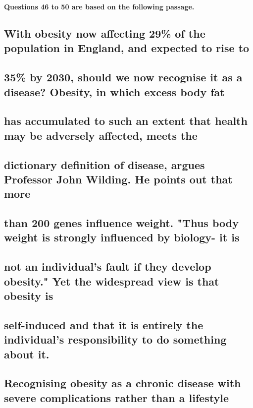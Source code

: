 \documentclass[UTF8,11pt]{ctexart}
\begin{document}
\textbf{Questions 46 to 50 are based on the following passage.}


\subsection*{\textbf{With obesity now affecting 29\% of the population in England, and expected to rise to}}


\subsection*{\textbf{35\% by 2030, should we now recognise it as a disease? Obesity, in which excess body fat}}


\subsection*{\textbf{has accumulated to such an extent that health may be adversely affected, meets the}}


\subsection*{\textbf{dictionary definition of disease, argues Professor John Wilding. He points out that more}}


\subsection*{\textbf{than 200 genes influence weight. "Thus body weight is strongly influenced by biology- it is}}


\subsection*{\textbf{not an individual's fault if they develop obesity." Yet the widespread view is that obesity is}}


\subsection*{\textbf{self-induced and that it is entirely the individual's responsibility to do something about it.}}


\subsection*{\textbf{Recognising obesity as a chronic disease with severe complications rather than a lifestyle}}
\end{document}
